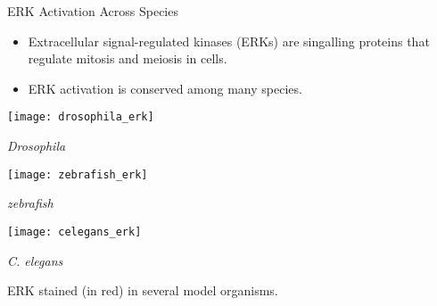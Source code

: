 \begin{frame}{ERK Activation Across Species}
	\begin{itemize}
		\item 	Extracellular signal-regulated kinases (ERKs) are singalling proteins that regulate mitosis and meiosis in cells.

		\item	ERK activation is conserved among many species.

	\end{itemize}
	
    \centering
    \begin{minipage}{0.2\textwidth}
        \texttt{[image: drosophila\_erk]}\\
        {\scriptsize \em Drosophila \par}
    \end{minipage}
    \hspace{0.5in}
    \begin{minipage}{0.2\textwidth}
        \texttt{[image: zebrafish\_erk]}\\
        {\scriptsize \em zebrafish \par}
    \end{minipage}
    \vspace{0.2in}
    
    \centering
    \begin{minipage}{0.4\textwidth}
        \texttt{[image: celegans\_erk]}\\
        {\scriptsize \em C. elegans \par}
    \end{minipage}
    
	\vspace{0.1in}
    ERK stained (in red) in several model organisms.
    
\end{frame}

